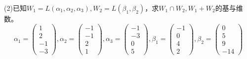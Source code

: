 \begin{exercise}[和与交基本计算]
  (2)已知$W_1 = L(\alpha_1,\alpha_2,\alpha_3), W_2 = L(\beta_1,\beta_2)$，求$W_1 \cap W_2, W_1 + W_2$的基与维数。
  \begin{equation*}
    \alpha_1 = \left(
      \begin{array}{c}
        1\\
        2\\
        -1\\
        -3
      \end{array}
    \right), \alpha_2 = \left(
      \begin{array}{c}
        -1\\
        -1\\
        2\\
        1
      \end{array}
    \right), \alpha_3 = \left(
      \begin{array}{c}
        -1\\
        -3\\
        0\\
        5
      \end{array}
    \right),
    \beta_1 = \left(
      \begin{array}{c}
        -1\\
        0\\
        4\\
        2
      \end{array}
    \right), \beta_2 = \left(
      \begin{array}{c}
        0\\
        5\\
        9\\
        -14
      \end{array}
    \right)
  \end{equation*}
\end{exercise}

